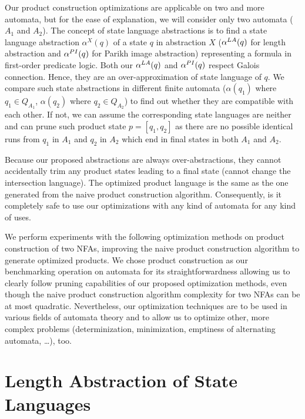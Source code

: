 Our product construction optimizations are applicable on two and more automata, but for the ease of explanation, we will consider only two automata ($A_1$ and $A_2$). The concept of state language abstractions is to find a state language abstraction $\alpha^X(q)$ of a state $q$ in abstraction $X$ ($\alpha^{LA}(q)$ for length abstraction and $\alpha^{PI}(q)$ for Parikh image abstraction) representing a formula in first-order predicate logic. Both our $\alpha^{LA}(q)$ and $\alpha^{PI}(q)$ respect Galois connection. Hence, they are an over-approximation of state language of $q$. We compare such state abstractions in different finite automata ($\alpha(q_1)$ where $q_1 \in Q_{A_1}$, $\alpha(q_2)$ where $q_2 \in Q_{A_2}$) to find out whether they are compatible with each other. If not, we can assume the corresponding state languages are neither and can prune such product state $p = [q_1, q_2]$ as there are no possible identical runs from $q_1$ in $A_1$ and $q_2$ in $A_2$ which end in final states in both $A_1$ and $A_2$.

Because our proposed abstractions are always over-abstractions, they cannot accidentally trim any product states leading to a final state (cannot change the intersection language). The optimized product language is the same as the one generated from the naive product construction algorithm. Consequently, is it completely safe to use our optimizations with any kind of automata for any kind of uses.

We perform experiments with the following optimization methods on product construction of two NFAs, improving the naive product construction algorithm to generate optimized products. We chose product construction as our benchmarking operation on automata for its straightforwardness allowing us to clearly follow pruning capabilities of our proposed optimization methods, even though the naive product construction algorithm complexity for two NFAs can be at most quadratic. Nevertheless, our optimization techniques are to be used in various fields of automata theory and to allow us to optimize other, more complex problems (determinization, minimization, emptiness of alternating automata, \ldots), too.


\section{Length Abstraction of State Languages}

